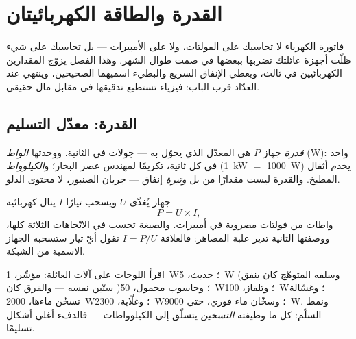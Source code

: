 \chapter{القدرة والطاقة الكهربائيتان}\label{ch:g9:electric-power-energy}

فاتورة الكهرباء لا تحاسبك على الفولتات، ولا على الأمبيرات ---
بل تحاسبك على شيء ظلّت أجهزة عائلتك تضربها ببعضها في صمت طوال
الشهر. وهذا الفصل يزوّج المقدارين الكهربائيين في ثالث، ويعطي
الإنفاق السريع والبطيء اسميهما الصحيحين، وينتهي عند العدّاد
قرب الباب: فيزياء تستطيع تدقيقها في مقابل مال حقيقي.

\section{القدرة: معدّل التسليم}

\begin{definition}\label{def:g9:electric-power-energy:power}
\emph{قدرة} جهاز $P$ هي المعدّل الذي يحوّل به
 --- جولات في الثانية. ووحدتها \emph{الواط}
(\unit{W}):  واحد في كل ثانية، تكريمًا لمهندس عصر البخار؛
و\emph{الكيلوواط} (\qty{1}{kW} $=$ \qty{1000}{W}) يخدم أثقال
المطبخ. والقدرة ليست مقدارًا من  بل \emph{وتيرة} إنفاق
--- جريان الصنبور، لا محتوى الدلو.
\end{definition}

\begin{proposition}\label{prop:g9:electric-power-energy:UI}
جهاز يُغذّى  $U$ ويسحب تيارًا $I$ ينال  كهربائية
\[
P = U \times I ,
\]
واطات من فولتات مضروبة في أمبيرات. والصيغة تحسب في الاتّجاهات
الثلاثة كلها، ووصفتها الثانية تدير علبة المصاهر: فالعلاقة $I = P/U$
تقول أيّ تيار ستسحبه  الجهاز الاسمية من الشبكة.
\end{proposition}

\begin{example}[سلّم البيت]\label{ex:g9:electric-power-energy:ladder}
اقرأ اللوحات على آلات العائلة:  مؤشّر، \qty{1}{W}؛ 
حديث، \qty{5}{W} (وسلفه المتوهّج كان ينفق ستّين  نفسه ---
والفرق كان )؛ وحاسوب محمول، \qty{50}{W}؛ وتلفاز،
\qty{100}{W}؛ وغسّالة تسخّن ماءها، \qty{2000}{W}؛ وغلّاية،
\qty{2300}{W}؛ وسخّان ماء فوري، حتى \qty{9000}{W}. ونمط
السلّم: كل ما وظيفته \emph{التسخين} يتسلّق إلى الكيلوواطات ---
فالدفء أغلى أشكال  تسليمًا.
\end{example}

